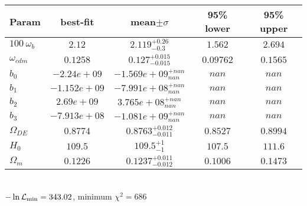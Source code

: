 \begin{tabular}{|l|c|c|c|c|} 
 \hline 
Param & best-fit & mean$\pm\sigma$ & 95\% lower & 95\% upper \\ \hline 
$100~\omega_{b }$ &$2.12$ & $2.119_{-0.3}^{+0.26}$ & $1.562$ & $2.694$ \\ 
$\omega_{cdm }$ &$0.1258$ & $0.127_{-0.015}^{+0.015}$ & $0.09762$ & $0.1565$ \\ 
$b_{0 }$ &$-2.24e+09$ & $-1.569e+09_{nan}^{+nan}$ & $nan$ & $nan$ \\ 
$b_{1 }$ &$-1.152e+09$ & $-7.991e+08_{nan}^{+nan}$ & $nan$ & $nan$ \\ 
$b_{2 }$ &$2.69e+09$ & $3.765e+08_{nan}^{+nan}$ & $nan$ & $nan$ \\ 
$b_{3 }$ &$-7.913e+08$ & $-1.081e+09_{nan}^{+nan}$ & $nan$ & $nan$ \\ 
$\Omega_{DE}$ &$0.8774$ & $0.8763_{-0.011}^{+0.012}$ & $0.8527$ & $0.8994$ \\ 
$H_{0 }$ &$109.5$ & $109.5_{-1}^{+1}$ & $107.5$ & $111.6$ \\ 
$\Omega_{m }$ &$0.1226$ & $0.1237_{-0.012}^{+0.011}$ & $0.1006$ & $0.1473$ \\ 
\hline 
 \end{tabular} \\ 
$-\ln{\cal L}_\mathrm{min} =343.02$, minimum $\chi^2=686$ \\ 
